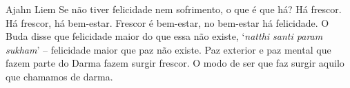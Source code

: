 
\begin{quotepage}{0.6\linewidth}{Ajahn Liem}
Se não tiver felicidade nem sofrimento, o que é que há? Há frescor. Há
frescor, há bem-estar. Frescor é bem-estar, no bem-estar há felicidade.
O Buda disse que felicidade maior do que essa não existe,
‘\textit{natthi santi param sukham}’ – felicidade maior que
paz não existe. Paz exterior e paz mental que fazem parte do Darma
fazem surgir frescor. O modo de ser que faz surgir aquilo que chamamos de darma.
\end{quotepage}

